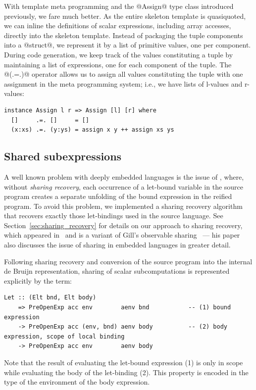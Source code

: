 With template meta programming and the @Assign@ type class introduced
previously, we fare much better. As the entire skeleton template is
quasiquoted\qq{}, we can inline the definitions of scalar expressions, including
array accesses, directly into the skeleton template. Instead of packaging the
tuple components into a @struct@, we represent it by a list of primitive values,
one per component. During code generation, we keep track of the values
constituting a tuple by maintaining a list of expressions, one for each
component of the tuple. The @(.=.)@ operator allows us to assign all values
constituting the tuple with one assignment in the meta programming system; i.e.,
we have lists of l-values and r-values:
%
\begin{lstlisting}[style=haskell]
instance Assign l r => Assign [l] [r] where
  []     .=. []     = []
  (x:xs) .=. (y:ys) = assign x y ++ assign xs ys
\end{lstlisting}

\cg[tuples|)]{}

\subsection{Shared subexpressions}
\label{sec:shared_subexpressions}

\cg[sharing|(]{}

A well known problem with deeply embedded languages is the issue of
, where, without \emph{sharing recovery}, each occurrence of
a let-bound variable in the source program creates a separate unfolding of the
bound expression in the reified program. To avoid this problem, we implemented a
sharing recovery algorithm that recovers exactly those let-bindings used in the
source language. See Section~\ref{sec:sharing_recovery} for details on our
approach to sharing recovery, which appeared in~\cite{McDonell:2013wi} and is a
variant of Gill's observable sharing~\cite{Gill:2009dx} --- his paper also
discusses the issue of sharing in embedded languages in greater detail.

Following sharing recovery and conversion of the source program into the
internal de Bruijn representation, sharing of scalar subcomputations is
represented explicitly by the term:
%
\begin{lstlisting}[style=haskell]
Let :: (Elt bnd, Elt body)
    => PreOpenExp acc env        aenv bnd           -- (1) bound expression
    -> PreOpenExp acc (env, bnd) aenv body          -- (2) body expression, scope of local binding
    -> PreOpenExp acc env        aenv body
\end{lstlisting}
%
Note that the result of evaluating the let-bound expression (1) is only in scope
while evaluating the body of the let-binding (2). This property is encoded in
the type of the environment of the body expression.

